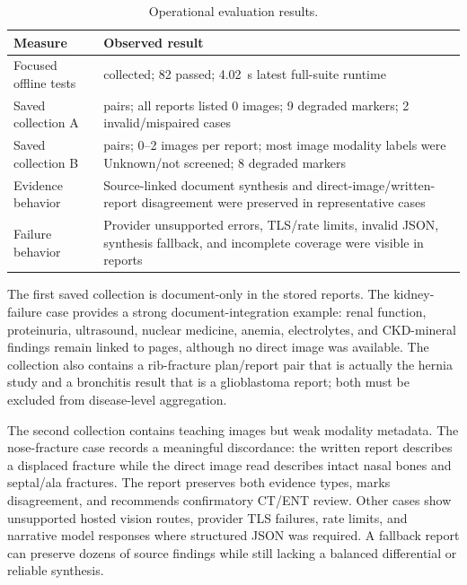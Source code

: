\documentclass[a4paper,conference]{IEEEtran}
\begin{document}
\begin{table}[t]
\caption{Operational evaluation results.}
\label{tab:operational}
\centering
\scriptsize
\begin{tabular}{@{}>{\raggedright\arraybackslash}p{}>{\raggedright\arraybackslash}p{}@{}}
\toprule
\textbf{Measure} & \textbf{Observed result}\\
\midrule
Focused offline tests & 82 collected; 82 passed; 4.02~s latest full-suite runtime\\
Saved collection A & 10 pairs; all reports listed 0 images; 9 degraded markers; 2 invalid/mispaired cases\\
Saved collection B & 10 pairs; 0--2 images per report; most image modality labels were Unknown/not screened; 8 degraded markers\\
Evidence behavior & Source-linked document synthesis and direct-image/written-report disagreement were preserved in representative cases\\
Failure behavior & Provider unsupported errors, TLS/rate limits, invalid JSON, synthesis fallback, and incomplete coverage were visible in reports\\
\bottomrule
\end{tabular}
\end{table}

The first saved collection is document-only in the stored reports. The kidney-failure case provides a strong document-integration example: renal function, proteinuria, ultrasound, nuclear medicine, anemia, electrolytes, and CKD-mineral findings remain linked to pages, although no direct image was available. The collection also contains a rib-fracture plan/report pair that is actually the hernia study and a bronchitis result that is a glioblastoma report; both must be excluded from disease-level aggregation.

The second collection contains teaching images but weak modality metadata. The nose-fracture case records a meaningful discordance: the written report describes a displaced fracture while the direct image read describes intact nasal bones and septal/ala fractures. The report preserves both evidence types, marks disagreement, and recommends confirmatory CT/ENT review. Other cases show unsupported hosted vision routes, provider TLS failures, rate limits, and narrative model responses where structured JSON was required. A fallback report can preserve dozens of source findings while still lacking a balanced differential or reliable synthesis.
\end{document}
